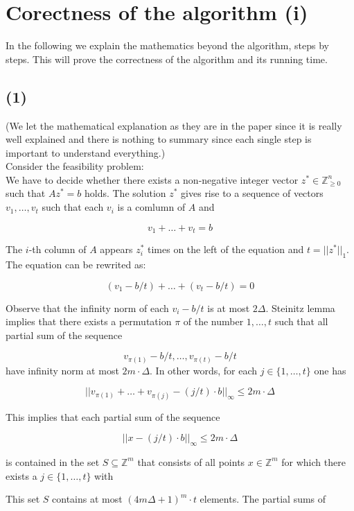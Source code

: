 \documentclass[12pt]{article}
\theoremstyle{definition}
\begin{document}
\section{Corectness of the algorithm (i)}

In the following we explain the mathematics beyond the algorithm, steps by steps. This will prove the correctness of the algorithm and its running time.

\subsection{(1)}
(We let the mathematical explanation as they are in the paper since it is really well explained and there is nothing to summary since each single step is important to understand everything.) \\
Consider the feasibility problem: \\
We have to decide whether there exists a non-negative integer vector $z^* \in \mathbb{Z}^n_{\geq 0}$ such that $A z^* = b$ holds.
The solution $z^*$ gives rise to a sequence of vectors $v_1, \dots, v_t$ such that each $v_i$ is a comlumn of $A$ and

$$
v_1 + \dots + v_t = b
$$

The $i$-th column of $A$ appears $z_i^*$ times on the left of the equation and $t = ||z^*||_1$. The equation can be rewrited as:

$$
(v_1 - b/t) + \dots + (v_t - b/t) = 0
$$

Observe that the infinity norm of each $v_i - b/t$ is at most $2\Delta$. Steinitz lemma implies that there exists a permutation $\pi$ of the number $1, \dots, t$ such that all partial sum of the sequence

$$
v_{\pi(1)}- b/t, \dots, v_{\pi(t)}- b/t
$$
have infinity norm at most $2 m \cdot \Delta$. In other words, for each $j \in \{1, \dots, t\}$ one has

$$
||v_{\pi(1)} + \dots + v_{\pi(j)} - (j/t) \cdot b||_{\infty} \leq 2m \cdot \Delta
$$

This implies that each partial sum of the sequence 

$$
||x - (j/t) \cdot b||_{\infty} \leq 2 m \cdot \Delta
$$

is contained in the set $S \subseteq \mathbb{Z}^m$ that consists of all points $x \in \mathbb{Z}^m$ for which there exists a $j \in \{1, \dots, t\}$ with 

This set $S$ contains at most $(4 m \Delta+1)^m \cdot t$ elements. The partial sums of 
\end{document}
